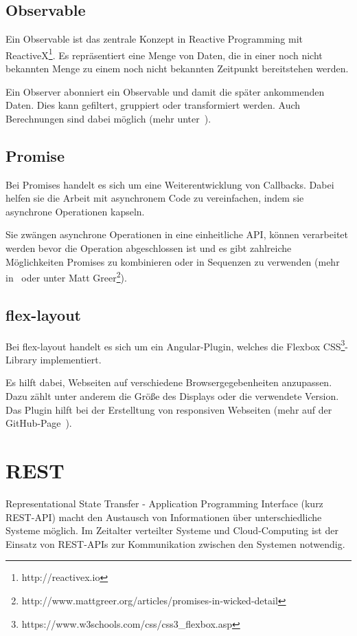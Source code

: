 \subsection{Observable}
Ein Observable ist das zentrale Konzept in Reactive Programming mit ReactiveX\footnote{http://reactivex.io}. Es
repräsentiert eine Menge von Daten, die in einer noch nicht bekannten Menge zu einem noch nicht bekannten Zeitpunkt
bereitstehen werden.

Ein Observer abonniert ein Observable und damit die später ankommenden Daten. Dies kann gefiltert, gruppiert oder
transformiert werden. Auch Berechnungen sind dabei möglich (mehr unter~\cite{book_grundlagen_observable}).

\subsection{Promise}
Bei Promises handelt es sich um eine Weiterentwicklung von Callbacks. Dabei helfen sie die Arbeit mit asynchronem Code
zu vereinfachen, indem sie asynchrone Operationen kapseln.

Sie zwängen asynchrone Operationen in eine einheitliche API, können verarbeitet werden bevor die Operation abgeschlossen
ist und es gibt zahlreiche Möglichkeiten Promises zu kombinieren oder in Sequenzen zu verwenden (mehr
in~\cite{book_grundlagen_promises} oder unter Matt Greer\footnote{http://www.mattgreer.org/articles/promises-in-wicked-detail}).

\subsection{flex-layout}
Bei flex-layout handelt es sich um ein Angular-Plugin, welches die Flexbox
CSS\footnote{https://www.w3schools.com/css/css3\_flexbox.asp}-Library implementiert.

Es hilft dabei, Webseiten auf verschiedene Browsergegebenheiten anzupassen. Dazu zählt unter anderem die Größe des
Displays oder die verwendete Version. Das Plugin hilft bei der Erstelltung von responsiven Webseiten (mehr auf der
GitHub-Page~\cite{online_grundlagen_flexlayout}).

\section{REST}
Representational State Transfer - Application Programming Interface (kurz REST-API) macht den Austausch von Informationen
über unterschiedliche Systeme möglich. Im Zeitalter verteilter Systeme und Cloud-Computing ist der Einsatz von REST-APIs
zur Kommunikation zwischen den Systemen notwendig.

